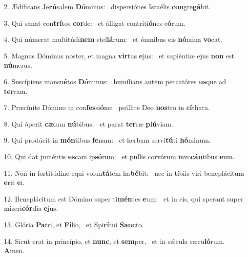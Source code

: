 2. Ædíficans Je\textbf{rú}salem \textbf{Dó}minus: \ast\  dispersiónes Israélis \textbf{con}gre\textbf{gá}bit.\

3. Qui sanat con\textbf{trí}tos \textbf{cor}de: \ast\  et álligat contriti\textbf{ó}nes e\textbf{ó}rum.\

4. Qui númerat multitúdi\textbf{nem} stel\textbf{lá}rum: \ast\  et ómnibus eis \textbf{nó}mina \textbf{vo}cat.\

5. Magnus Dóminus noster, et magna \textbf{vir}tus \textbf{e}jus: \ast\  et sapiéntiæ ejus \textbf{non} est \textbf{nú}merus.\

6. Suscípiens mansu\textbf{é}tos \textbf{Dó}minus: \ast\  humílians autem peccatóres \textbf{us}que ad \textbf{ter}ram.\

7. Præcínite Dómino in con\textbf{fes}si\textbf{ó}ne: \ast\  psállite Deo \textbf{nos}tro in \textbf{cí}thara.\

8. Qui óperit \textbf{cæ}lum \textbf{nú}bibus: \ast\  et parat \textbf{ter}ræ \textbf{plú}viam.\

9. Qui prodúcit in \textbf{món}tibus \textbf{fe}num: \ast\  et herbam servi\textbf{tú}ti \textbf{hó}minum.\

10. Qui dat juméntis \textbf{es}cam ip\textbf{só}rum: \ast\  et pullis corvórum invo\textbf{cán}tibus \textbf{e}um.\

11. Non in fortitúdine equi volun\textbf{tá}tem ha\textbf{bé}bit: \ast\  nec in tíbiis viri beneplácitum \textbf{e}rit \textbf{e}i.\

12. Beneplácitum est Dómino super ti\textbf{mén}tes \textbf{e}um: \ast\  et in eis, qui sperant super miseri\textbf{cór}dia \textbf{e}jus.\

13. Glória \textbf{Pa}tri, et \textbf{Fí}lio, \ast\  et Spi\textbf{rí}tui \textbf{Sanc}to.\

14. Sicut erat in princípio, et \textbf{nunc}, et \textbf{sem}per, \ast\  et in sǽcula sæcu\textbf{ló}rum. \textbf{A}men.\

